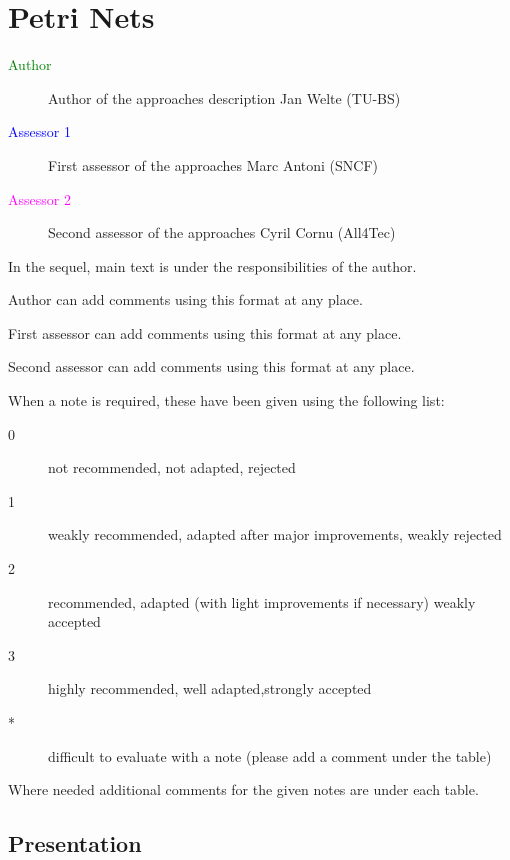 \chapter{Petri Nets}

\begin{description}
\item[\textcolor{green}{Author}] Author of the approaches description  Jan Welte (TU-BS)
\item[\textcolor{blue}{Assessor 1}] First assessor of the approaches Marc Antoni (SNCF)
\item[\textcolor{magenta}{Assessor 2}] Second assessor of the approaches Cyril Cornu (All4Tec)
\end{description}

In the sequel, main text is under the responsibilities of the author.

\begin{author_comment}
Author can add comments using this format at any place.
\end{author_comment}

\begin{assessor1}
First assessor can add comments using this format at any place.
\end{assessor1}

\begin{assessor2}
Second assessor can add comments using this format at any place.
\end{assessor2}


When a note is required, these have been given using the following list:
\begin{description}
\item[0] not recommended, not adapted, rejected
\item[1] weakly recommended, adapted after major improvements, weakly rejected
\item[2] recommended, adapted (with light improvements if necessary)  weakly accepted
\item[3] highly recommended, well adapted,strongly accepted
\item[*] difficult to evaluate with a note (please add a comment under the table)
\end{description}

Where needed additional comments for the given notes are under each table.

\section{Presentation}

